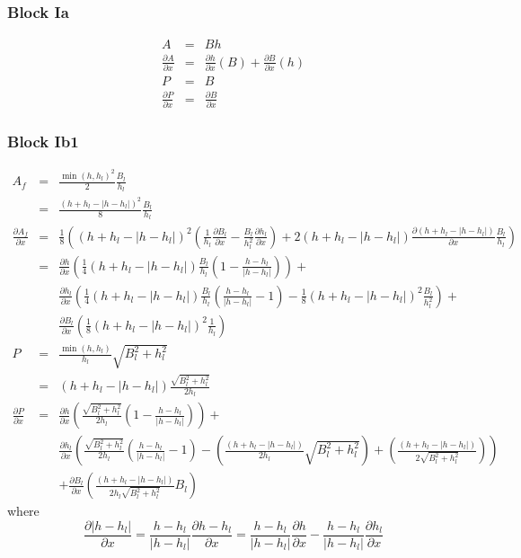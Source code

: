 \documentclass[a4paper, 11pt]{article}
\newcommand{\pa}[2]{\ensuremath{\frac{\partial #1}{\partial #2}}}
\begin{document}
\subsubsection{Block Ia}
\begin{eqnarray}
\nonumber
A&=& Bh\\
\nonumber
\pa{A}{x} &=& \pa{h}{x}\left(B\right) + \pa{B}{x}\left( h \right)\\
\nonumber
P&=& B\\
\nonumber
\pa{P}{x} &=& \pa{B}{x}
\end{eqnarray}

\subsubsection{Block Ib1}
\begin{eqnarray}
\nonumber
A_f&=& \frac{\min(h,h_l)^2}{2} \frac{B_l}{h_l}\\
\nonumber
&=& \frac{(h+h_l - |h-h_l|)^2}{8} \frac{B_l}{h_l} \\
\nonumber
\pa{A_f}{x} &=& \frac{1}{8} \left( (h+h_l - |h-h_l|)^2 \left(\frac{1}{h_l}\pa{B_l}{x} - \frac{B_l}{h_l^2}\pa{h_l}{x}\right) + 2 \left(h+h_l - |h-h_l|\right) \pa{(h+h_l - |h-h_l|)}{x} \frac{B_l}{h_l} \right)\\
\nonumber 
&=& \pa{h}{x} \left( \frac{1}{4} \left(h+h_l - |h-h_l|\right)\frac{B_l}{h_l}\left(1- \frac{h-h_l}{|h-h_l|}\right) \right) +\\
\nonumber
&& 
\pa{h_l}{x} \left( \frac{1}{4} \left(h+h_l - |h-h_l|\right)\frac{B_l}{h_l}\left(\frac{h-h_l}{|h-h_l|}-1\right) - \frac{1}{8} (h+h_l - |h-h_l|)^2 \frac{B_l}{h_l^2} \right) +\\
\nonumber
&&
\pa{B_l}{x} \left( \frac{1}{8} \left(h+h_l - |h-h_l|\right)^2 \frac{1}{h_l}\right)\\
\nonumber
P&=& \frac{\min(h,h_l)}{h_l} \sqrt{B_l^2 + h_l^2}\\
\nonumber
&=& (h+h_l-|h-h_l|)\frac{\sqrt{B_l^2 + h_l^2}}{2h_l}\\
\nonumber
\pa{P}{x} &=& \pa{h}{x} \left(\frac{\sqrt{B_l^2 + h_l^2}}{2h_l}\left(1-\frac{h-h_l}{|h-h_l|}\right) \right) +\\
\nonumber
&&  \pa{h_l}{x} \left(\frac{\sqrt{B_l^2 + h_l^2}}{2h_l}\left(\frac{h-h_l}{|h-h_l|}-1 \right) -  \left( \frac{(h+h_l-|h-h_l|)}{2h_l}\sqrt{B_l^2 + h_l^2}\right) +
 \left( \frac{(h+h_l-|h-h_l|)}{2\sqrt{B_l^2 + h_l^2}}\right) \right) \\
\nonumber
&& +  \pa{B_l}{x} \left( \frac{(h+h_l-|h-h_l|)}{2h_l\sqrt{B_l^2 + h_l^2}}B_l \right)
\end{eqnarray}
where 
$$ \pa{|h-h_l|}{x} = \frac{h-h_l}{|h-h_l|}\pa{h-h_l}{x}= \frac{h-h_l}{|h-h_l|}\pa{h}{x} - \frac{h-h_l}{|h-h_l|}\pa{h_l}{x}$$
\end{document}

